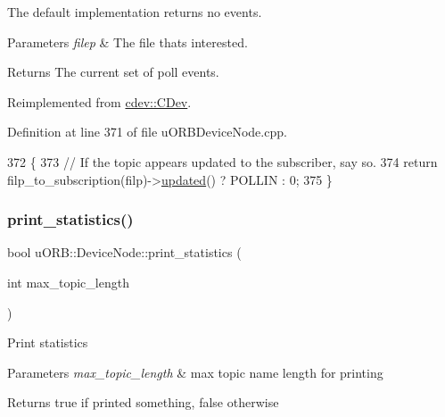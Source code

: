 The default implementation returns no events.


\begin{DoxyParams}{Parameters}
{\em filep} & The file that\textquotesingle{}s interested. \\
\hline
\end{DoxyParams}
\begin{DoxyReturn}{Returns}
The current set of poll events. 
\end{DoxyReturn}


Reimplemented from \hyperlink{classcdev_1_1CDev_abf40a822665b0889584268e8a4dfbef2}{cdev\+::\+C\+Dev}.



Definition at line 371 of file u\+O\+R\+B\+Device\+Node.\+cpp.


\begin{DoxyCode}
372 \{
373     \textcolor{comment}{// If the topic appears updated to the subscriber, say so.}
374     \textcolor{keywordflow}{return} filp\_to\_subscription(filp)->\hyperlink{classuORB_1_1SubscriptionInterval_aa1c12b83d65604e306b919a2c224e32e}{updated}() ? POLLIN : 0;
375 \}
\end{DoxyCode}
\mbox{\label{classuORB_1_1DeviceNode_ad37197e0ca241eff70bd5aeeb4a811a2}} 
\subsubsection{\texorpdfstring{print\+\_\+statistics()}{print\_statistics()}}
{\footnotesize\ttfamily bool u\+O\+R\+B\+::\+Device\+Node\+::print\+\_\+statistics (\begin{DoxyParamCaption}\item[{int}]{max\+\_\+topic\+\_\+length }\end{DoxyParamCaption})}

Print statistics 
\begin{DoxyParams}{Parameters}
{\em max\+\_\+topic\+\_\+length} & max topic name length for printing \\
\hline
\end{DoxyParams}
\begin{DoxyReturn}{Returns}
true if printed something, false otherwise 
\end{DoxyReturn}


